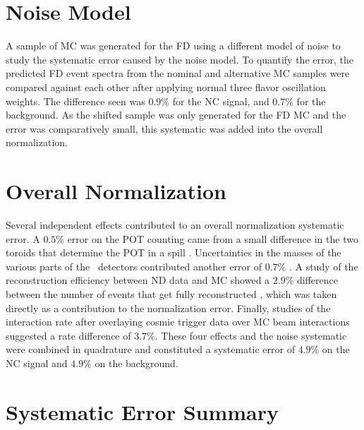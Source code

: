\section{Noise Model}
\label{sec:SystNoise}

A sample of MC was generated for the FD using a different model of noise to study the systematic error caused by the noise model. To quantify the error, the predicted FD event spectra from the nominal and alternative MC samples were compared against each other after applying normal three flavor oscillation weights. The difference seen was $0.9\%$ for the NC signal, and $0.7\%$ for the background. As the shifted sample was only generated for the FD MC and the error was comparatively small, this systematic was added into the overall normalization.

\section{Overall Normalization}
\label{sec:SystNorm}

Several independent effects contributed to an overall normalization systematic error. A $0.5\%$ error on the POT counting came from a small difference in the two toroids that determine the POT in a spill \cite{ref:TNBeam}. Uncertainties in the masses of the various parts of the \nova~detectors contributed another error of $0.7\%$ \cite{ref:MassError}. A study of the reconstruction efficiency between ND data and MC showed a $2.9\%$ difference between the number of events that get fully reconstructed \cite{ref:NDDataMCRecoEff}, which was taken directly as a contribution to the normalization error. Finally, studies of the interaction rate after overlaying cosmic trigger data over MC beam interactions suggested a rate difference of $3.7\%$. These four effects and the noise systematic were combined in quadrature and constituted a systematic error of $4.9\%$ on the NC signal and $4.9\%$ on the background.

\section{Systematic Error Summary}
\label{sec:SystSummary}

